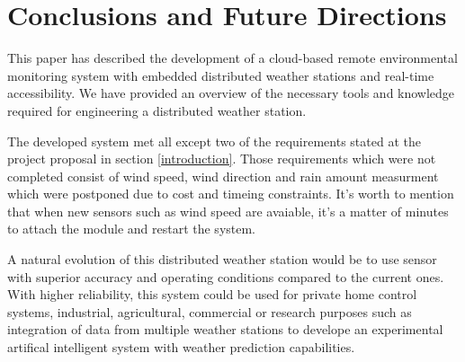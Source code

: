 \section{Conclusions and Future Directions}
\label{sec:conclusions}
This paper has described the development of a cloud-based remote environmental
monitoring system with embedded distributed weather stations and real-time accessibility.
We have provided an overview of the necessary tools and knowledge required
for engineering a distributed weather station.

The developed system met all except two of the requirements stated at the project proposal in section \ref{introduction}.
Those requirements which were not completed consist of wind speed, wind direction and rain amount measurment which
were postponed due to cost and timeing constraints. It's worth to mention that when new sensors such as wind speed are avaiable,
it's a matter of minutes to attach the module and restart the system.

A natural evolution of this distributed weather station would be to use sensor with superior
accuracy and operating conditions compared to the current ones. With higher reliability,
this system could be used for private home control systems, industrial, agricultural, commercial or research purposes such as integration of
data from multiple weather stations to develope an experimental artifical intelligent system
with weather prediction capabilities.
